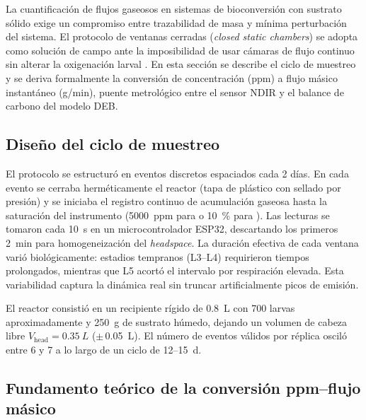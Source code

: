 
La cuantificación de flujos gaseosos en sistemas de bioconversión con sustrato sólido exige un compromiso entre trazabilidad de masa y mínima perturbación del sistema. El protocolo de ventanas cerradas (\textit{closed static chambers}) se adopta como solución de campo ante la imposibilidad de usar cámaras de flujo continuo sin alterar la oxigenación larval \parencite{rossiEstimatingDynamicsGreenhouse2024a, parodiBioconversionEfficienciesGreenhouse2020a}. En esta sección se describe el ciclo de muestreo y se deriva formalmente la conversión de concentración (\si{ppm}) a flujo másico instantáneo (\si{g/min}), puente metrológico entre el sensor NDIR y el balance de carbono del modelo DEB.

\subsection{Diseño del ciclo de muestreo}
\label{subsec:cap2_ciclo_muestreo}

El protocolo se estructuró en eventos discretos espaciados cada 2 días. En cada evento se cerraba herméticamente el reactor (tapa de plástico con sellado por presión) y se iniciaba el registro continuo de acumulación gaseosa hasta la saturación del instrumento (\num{5000}~ppm para  o \SI{10}{\percent} para ). Las lecturas se tomaron cada \SI{10}{\second} en un microcontrolador ESP32, descartando los primeros \SI{2}{min} para homogeneización del \emph{headspace}. La duración efectiva de cada ventana varió biológicamente: estadios tempranos (L3--L4) requirieron tiempos prolongados, mientras que L5 acortó el intervalo por respiración elevada. Esta variabilidad captura la dinámica real sin truncar artificialmente picos de emisión.

El reactor consistió en un recipiente rígido de \SI{0.8}{L} con \num{700} larvas aproximadamente y \SI{250}{g} de sustrato húmedo, dejando un volumen de cabeza libre $V_{\text{head}} = \SI{0.35}{L}$ ($\pm$\,\SI{0.05}{L}). El número de eventos válidos por réplica osciló entre 6 y 7 a lo largo de un ciclo de 12--\SI{15}{\day}.

\subsection{Fundamento teórico de la conversión ppm--flujo másico}
\label{subsec:cap2_fundamento_teorico_conversion}

